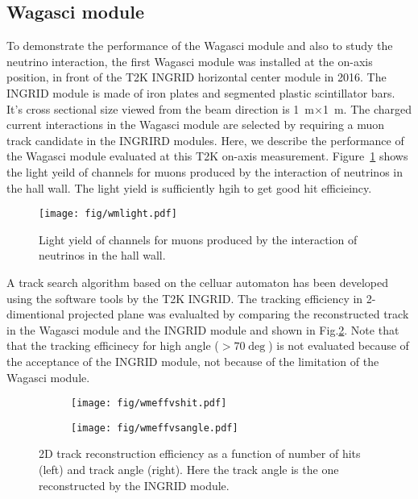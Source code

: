\subsection{Wagasci module}
To demonstrate the performance of the Wagasci module and also to study the neutrino interaction,
the first Wagasci module was installed at the on-axis position, in front of the T2K INGRID horizontal center module
in 2016.
The INGRID module is made of iron plates and segmented plastic scintillator bars.
It's cross sectional size viewed from the beam direction is 1~m$\times$1~m.
The charged current interactions in the Wagasci module are selected by requiring a muon track candidate
in the INGRIRD modules.
Here, we describe the performance of the Wagasci module evaluated at this T2K on-axis measurement.
Figure~\ref{fig:wmlight} shows the light yeild of channels for muons produced by the interaction of neutrinos
in the hall wall.
The light yield is sufficiently hgih to get good hit efficieincy.  
\begin{figure}[tbh]
\begin{center}
\texttt{[image: fig/wmlight.pdf]}
\end{center}
\caption{Light yield of channels for muons produced by the interaction of neutrinos
  in the hall wall.
}
\label{fig:wmlight}
\end{figure}
A track search algorithm based on the celluar automaton has been developed using the software tools by the T2K INGRID. 
The tracking efficiency in 2-dimentional projected plane was evalualted by comparing the reconstructed track
in the Wagasci module and the INGRID module and shown in Fig.\ref{fig:wmefficiency}.
Note that that the tracking efficinecy for high angle ($>70\deg$) is not evaluated because of the acceptance
of the INGRID module, not because of the limitation of the Wagasci module.
\begin{figure}[tbh]
  \begin{center}
   \begin{subfigure}{0.48\textwidth}
     \texttt{[image: fig/wmeffvshit.pdf]}
    \end{subfigure}
  \begin{subfigure}{0.48\textwidth}
      \texttt{[image: fig/wmeffvsangle.pdf]}
    \end{subfigure}    
    \end{center}
  \caption{2D track reconstruction efficiency as a function of number of hits (left) and track angle (right).
  Here the track angle is the one reconstructed by the INGRID module.}
\label{fig:wmefficiency}
\end{figure}

